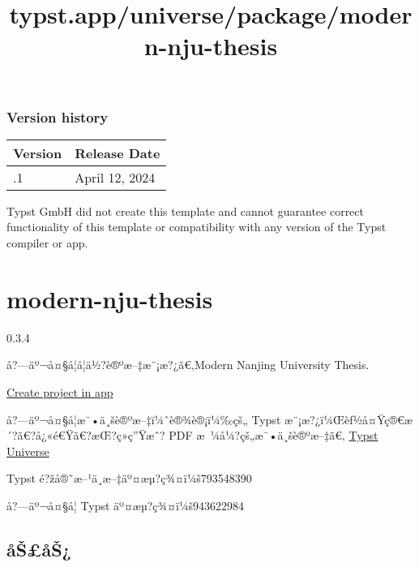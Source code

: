 \label{versions}
\subsubsection{Version history}\label{version-history}

\begin{longtable}[]{@{}ll@{}}
\toprule\noalign{}
Version & Release Date \\
\midrule\noalign{}
\endhead
\bottomrule\noalign{}
\endlastfoot
0.0.1 & April 12, 2024 \\
\end{longtable}

Typst GmbH did not create this template and cannot guarantee correct
functionality of this template or compatibility with any version of the
Typst compiler or app.


\title{typst.app/universe/package/modern-nju-thesis}

\label{banner}
\label{template-thumbnail}

\section{modern-nju-thesis}\label{modern-nju-thesis}

{ 0.3.4 }

å?---äº¬å¤§å­¦å­¦ä½?è®ºæ--‡æ¨¡æ?¿ã€‚Modern Nanjing University Thesis.

\href{/app?template=modern-nju-thesis&version=0.3.4}{Create project in
app}

\label{readme}
å?---äº¬å¤§å­¦æ¯•ä¸šè®ºæ--‡ï¼ˆè®¾è®¡ï¼‰çš„ Typst
æ¨¡æ?¿ï¼Œèƒ½å¤Ÿç®€æ´?ã€?å¿«é€Ÿã€?æŒ?ç»­ç''Ÿæˆ? PDF
æ~¼å¼?çš„æ¯•ä¸šè®ºæ--‡ã€‚
\href{https://typst.app/universe/package/modern-nju-thesis}{Typst
Universe}

Typst é?žå®˜æ--¹ä¸­æ--‡äº¤æµ?ç¾¤ï¼š793548390

å?---äº¬å¤§å­¦ Typst äº¤æµ?ç¾¤ï¼š943622984


\subsection{åŠ£åŠ¿}\label{uxe5ux161uxe5ux161}

